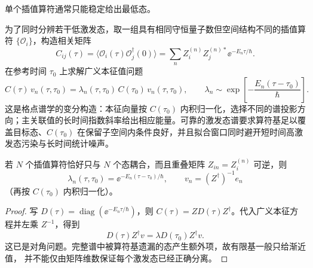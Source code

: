 单个插值算符通常只能稳定给出最低态。

\begin{definition}[关联矩阵与广义本征值]
为了同时分辨若干低激发态，取一组具有相同守恒量子数但空间结构不同的插值算符 $\{\mathcal O_i\}$，构造相关矩阵
\begin{equation}
 C_{ij}(\tau)=\langle\mathcal O_i(\tau)\mathcal O_j^\dagger(0)\rangle
 =\sum_n Z_i^{(n)}Z_j^{(n)*}\ee^{-E_n\tau/\hbar}.
 \label{eq:qcd-correlator-matrix-spectrum-dp68}
\end{equation}
在参考时间 $\tau_0$ 上求解广义本征值问题
\begin{equation}
 {
 C(\tau)\,v_n(\tau,\tau_0)
 =\lambda_n(\tau,\tau_0)\,C(\tau_0)\,v_n(\tau,\tau_0),
 \qquad
 \lambda_n\sim
 \exp\!\left[-\frac{E_n(\tau-\tau_0)}{\hbar}\right].}
 \label{eq:qcd-gevp-spectrum-dp32}
\end{equation}
这是格点谱学的变分构造：本征向量按 $C(\tau_0)$ 内积归一化，选择不同的谱投影方向；主关联值的长时间指数斜率给出相应能量。可靠的激发态谱要求算符基足以覆盖目标态、$C(\tau_0)$ 在保留子空间内条件良好，并且拟合窗口同时避开短时间高激发态污染与长时间统计噪声。
\end{definition}

\begin{proposition}[有限谱子空间中的精确对角化]
若 $N$ 个插值算符恰好只与 $N$ 个态耦合，而且重叠矩阵
$Z_{in}=Z_i^{(n)}$ 可逆，则
\begin{equation*}
\lambda_n(\tau,\tau_0)=\ee^{-E_n(\tau-\tau_0)/\hbar},
\qquad v_n=(Z^\dagger)^{-1}e_n
\end{equation*}
（再按 $C(\tau_0)$ 内积归一化）。
\end{proposition}
\begin{proof}
写 $D(\tau)=\operatorname{diag}(\ee^{-E_n\tau/\hbar})$，则
$C(\tau)=ZD(\tau)Z^\dagger$。代入广义本征方程并左乘 $Z^{-1}$，得到
\begin{equation*}
D(\tau)Z^\dagger v
=\lambda D(\tau_0)Z^\dagger v.
\end{equation*}
这已是对角问题。完整谱中被算符基遗漏的态产生额外项，故有限基一般只给渐近值，
并不能仅由矩阵维数保证每个激发态已经正确分离。
\end{proof}

